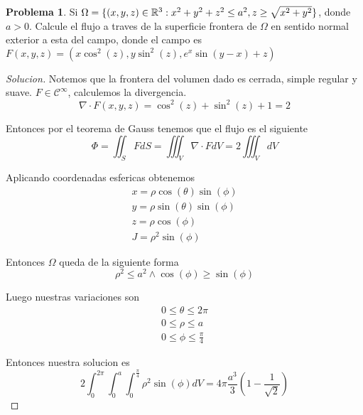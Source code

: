 \documentclass{article}
\theoremstyle{definition}
\newtheorem{problem}{Problema}
\newenvironment{solution}{\begin{proof}[Solucion]}{\end{proof}}
\begin{document}
\begin{problem}
Si $\Omega = \{(x, y, z) \in \mathbb{R}^{3} : x^{2} + y^{2} + z^{2} \leq a^{2}, z \geq \sqrt{x^{2} + y^{2}}\}$, donde $a > 0$. Calcule el flujo a traves de la superficie frontera de $\Omega$ en sentido normal exterior a esta del campo, donde el campo es $F(x, y, z) = (x \cos^{2}(z), y \sin^{2}(z), e^{x}\sin(y - x) + z)$
\end{problem}
\begin{solution}
Notemos que la frontera del volumen dado es cerrada, simple regular y suave. $F \in \mathcal{C}^{\infty}$, calculemos la divergencia.
\begin{equation*}
\nabla \cdot F(x, y, z) = \cos^{2}(z) + \sin^{2}(z) + 1 = 2
\end{equation*}

Entonces por el teorema de Gauss tenemos que el flujo es el siguiente
\begin{equation*}
\Phi = \iint_{S} F dS = \iiint_{V} \nabla \cdot F dV = 2 \iiint_{V} dV
\end{equation*}

Aplicando coordenadas esfericas obtenemos
\begin{gather*}
  x = \rho \cos(\theta) \sin(\phi)\\
  y = \rho \sin(\theta) \sin(\phi)\\
  z = \rho \cos(\phi)\\
  J = \rho^{2} \sin(\phi)
\end{gather*}

Entonces $\Omega$ queda de la siguiente forma
\begin{equation*}
  \rho^{2} \leq a^{2} \land \cos(\phi) \geq \sin(\phi)
\end{equation*}

Luego nuestras variaciones son
\begin{gather*}
  0 \leq \theta \leq 2\pi\\
  0 \leq \rho \leq a\\
  0 \leq \phi \leq \frac{\pi}{4}
\end{gather*}

Entonces nuestra solucion es
\begin{equation*}
2 \int_{0}^{2\pi}\int_{0}^{a}\int_{0}^{\frac{\pi}{4}} \rho^{2} \sin(\phi) dV = 4\pi \frac{a^{3}}{3} (1 - \frac{1}{\sqrt{2}})
\end{equation*}
\end{solution}
\end{document}
